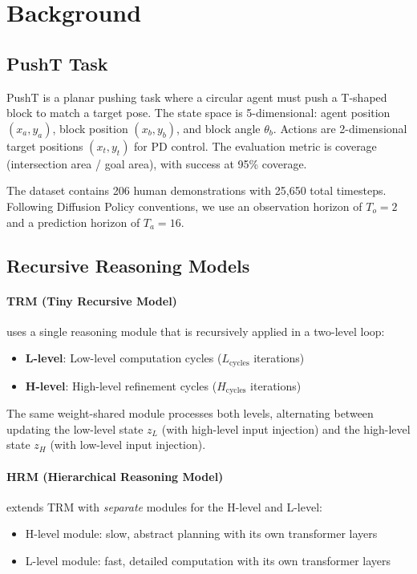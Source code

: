 \documentclass[11pt,a4paper]{article}
\begin{document}
\section{Background}

\subsection{PushT Task}
PushT is a planar pushing task where a circular agent must push a T-shaped block to match a target pose. The state space is 5-dimensional: agent position $(x_a, y_a)$, block position $(x_b, y_b)$, and block angle $\theta_b$. Actions are 2-dimensional target positions $(x_t, y_t)$ for PD control. The evaluation metric is coverage (intersection area / goal area), with success at 95\% coverage.

The dataset contains 206 human demonstrations with 25,650 total timesteps. Following Diffusion Policy conventions, we use an observation horizon of $T_o = 2$ and a prediction horizon of $T_a = 16$.

\subsection{Recursive Reasoning Models}

\paragraph{TRM (Tiny Recursive Model)} uses a single reasoning module that is recursively applied in a two-level loop:
\begin{itemize}[noitemsep]
    \item \textbf{L-level}: Low-level computation cycles ($L_{\text{cycles}}$ iterations)
    \item \textbf{H-level}: High-level refinement cycles ($H_{\text{cycles}}$ iterations)
\end{itemize}
The same weight-shared module processes both levels, alternating between updating the low-level state $z_L$ (with high-level input injection) and the high-level state $z_H$ (with low-level input injection).

\paragraph{HRM (Hierarchical Reasoning Model)} extends TRM with \textit{separate} modules for the H-level and L-level:
\begin{itemize}[noitemsep]
    \item H-level module: slow, abstract planning with its own transformer layers
    \item L-level module: fast, detailed computation with its own transformer layers
\end{itemize}
\end{document}
